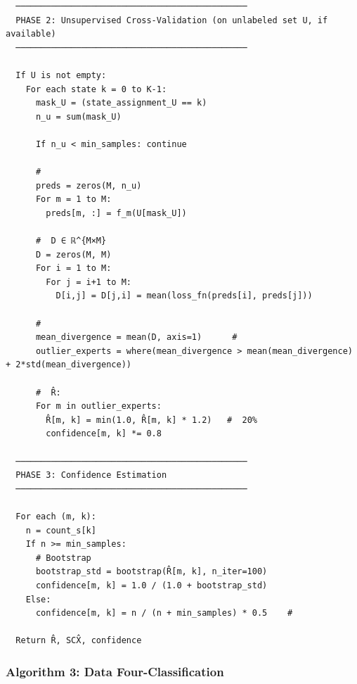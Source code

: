 \documentclass[
  12pt,
]{article}
\begin{document}
\begin{verbatim}
  ──────────────────────────────────────────────
  PHASE 2: Unsupervised Cross-Validation (on unlabeled set U, if available)
  ──────────────────────────────────────────────

  If U is not empty:
    For each state k = 0 to K-1:
      mask_U = (state_assignment_U == k)
      n_u = sum(mask_U)

      If n_u < min_samples: continue

      # 
      preds = zeros(M, n_u)
      For m = 1 to M:
        preds[m, :] = f_m(U[mask_U])

      #  D ∈ ℝ^{M×M}
      D = zeros(M, M)
      For i = 1 to M:
        For j = i+1 to M:
          D[i,j] = D[j,i] = mean(loss_fn(preds[i], preds[j]))

      # 
      mean_divergence = mean(D, axis=1)      # 
      outlier_experts = where(mean_divergence > mean(mean_divergence) + 2*std(mean_divergence))

      #  R̂: 
      For m in outlier_experts:
        R̂[m, k] = min(1.0, R̂[m, k] * 1.2)   #  20%
        confidence[m, k] *= 0.8

  ──────────────────────────────────────────────
  PHASE 3: Confidence Estimation
  ──────────────────────────────────────────────

  For each (m, k):
    n = count_s[k]
    If n >= min_samples:
      # Bootstrap 
      bootstrap_std = bootstrap(R̂[m, k], n_iter=100)
      confidence[m, k] = 1.0 / (1.0 + bootstrap_std)
    Else:
      confidence[m, k] = n / (n + min_samples) * 0.5    # 

  Return R̂, SCX̂, confidence
\end{verbatim}

\subsubsection{Algorithm 3: Data
Four-Classification}\label{algorithm-3-data-four-classification}
\end{document}
